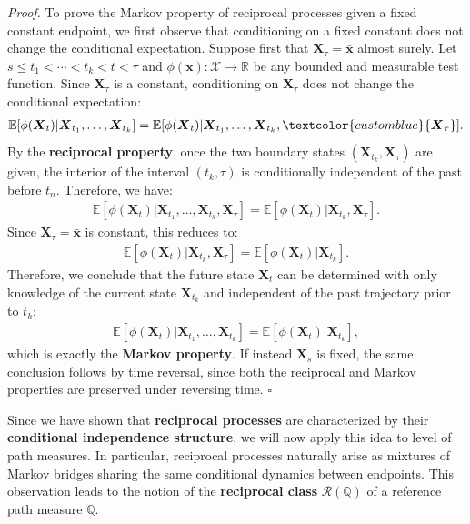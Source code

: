 \documentclass{article}
\newcommand{\boldtext}[1]{\textbf{\textcolor{MyGreen}{#1}}}
\newcommand{\bluetext}[1]{\textcolor{customblue}{#1}}
\begin{document}
\textit{Proof.} To prove the Markov property of reciprocal processes given a fixed constant endpoint, we first observe that conditioning on a fixed constant does not change the conditional expectation. Suppose first that $\boldsymbol{X}_\tau=\bar{\boldsymbol{x}}$ almost surely. Let $s \le t_1 < \cdots < t_k < t < \tau$ and $\phi(\boldsymbol{x}):\mathcal X\to\mathbb R$ be any bounded and measurable test function. Since $\boldsymbol{X}_\tau$ is a constant, conditioning on $\boldsymbol{X}_\tau$ does not change the conditional expectation:
\begin{align}
    \mathbb E[\phi(\boldsymbol{X}_t)| \boldsymbol{X}_{t_1},\dots,\boldsymbol{X}_{t_k}] = \mathbb E[\phi(\boldsymbol{X}_t)| \boldsymbol{X}_{t_1},\dots,\boldsymbol{X}_{t_k},\bluetext{\boldsymbol{X}_\tau}].
\end{align}
By the \textbf{reciprocal property}, once the two boundary states $(\boldsymbol{X}_{t_k},\boldsymbol{X}_\tau)$ are given, the interior of the interval $(t_k,\tau)$ is conditionally independent of the past before $t_n$. Therefore, we have:
\begin{align}
    \mathbb E[\phi(\boldsymbol{X}_t)| \boldsymbol{X}_{t_1},\dots,\boldsymbol{X}_{t_k},\boldsymbol{X}_\tau] = \mathbb E[\phi(\boldsymbol{X}_t)| \boldsymbol{X}_{t_k},\boldsymbol{X}_\tau].
\end{align}
Since $\boldsymbol{X}_\tau=\bar{\boldsymbol{x}}$ is constant, this reduces to:
\begin{align}
    \mathbb E[\phi(\boldsymbol{X}_t)| \boldsymbol{X}_{t_k},\boldsymbol{X}_\tau]= \mathbb E[\phi(\boldsymbol{X}_t)| \boldsymbol{X}_{t_k}].
\end{align}
Therefore, we conclude that the future state $\boldsymbol{X}_t$ can be determined with only knowledge of the current state $\boldsymbol{X}_{t_k}$ and independent of the past trajectory prior to $t_k$:
\begin{align}
    \mathbb E[\phi(\boldsymbol{X}_t)| \boldsymbol{X}_{t_1},\dots,\boldsymbol{X}_{t_k}] = \mathbb E[\phi(\boldsymbol{X}_t)| \boldsymbol{X}_{t_k}],
\end{align}
which is exactly the \textbf{Markov property}. If instead $\boldsymbol{X}_s$ is fixed, the same conclusion follows by time reversal, since both the reciprocal and Markov properties are preserved under reversing time. \hfill $\square$

Since we have shown that \textbf{reciprocal processes} are characterized by their \textbf{conditional independence structure}, we will now apply this idea to level of path measures. In particular, reciprocal processes naturally arise as mixtures of Markov bridges sharing the same conditional dynamics between endpoints. This observation leads to the notion of the \boldtext{reciprocal class} $\mathcal{R}(\mathbb{Q})$ of a reference path measure $\mathbb{Q}$. 
\end{document}
